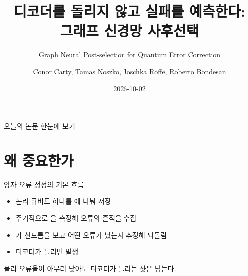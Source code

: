 

\title[GNN 사후선택 논문 리뷰]{디코더를 돌리지 않고 실패를 예측한다:\\ 그래프 신경망 사후선택}
\subtitle{Graph Neural Post-selection for Quantum Error Correction}
\author[Carty et al.]{Conor Carty, Tamas Noszko, Joschka Roffe, Roberto Bondesan}
\date{2026-10-02}



\begin{frame}[plain]
  \titlepage
\end{frame}

\begin{frame}{오늘의 논문 한눈에 보기}
  \vspace{-0.6em}
\end{frame}

\renewcommand{\secblurb}{오류 정정만으로는 부족할 때, 의심스러운 결과를 버리는 전략}
\section{왜 중요한가}

\begin{frame}{양자 오류 정정의 기본 흐름}
  \begin{itemize}
    \item 논리 큐비트 하나를 에 나눠 저장
    \item 주기적으로 을 측정해 오류의 흔적을 수집
    \item {}가 신드롬을 보고 어떤 오류가 났는지 추정해 되돌림
    \item 디코더가 틀리면  발생
  \end{itemize}
  \deckgap
  \begin{callout}[문제]
    물리 오류율이 아무리 낮아도 디코더가 틀리는 샷은 남는다.
  \end{callout}
\end{frame}


